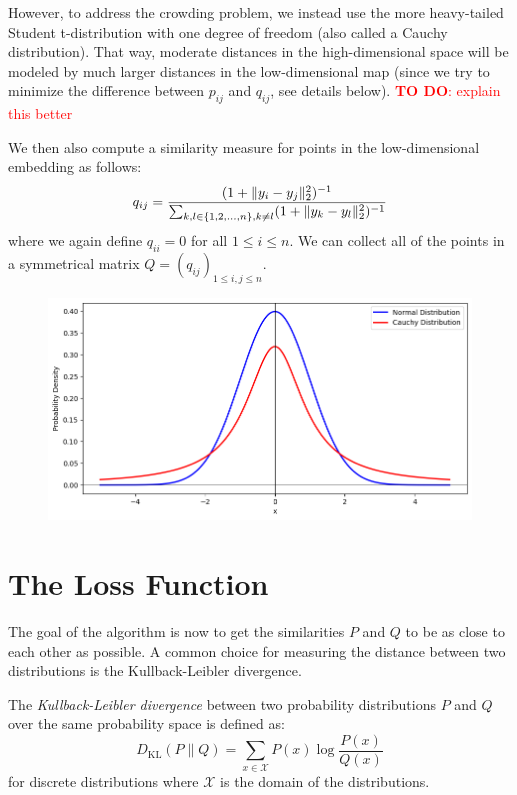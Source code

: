 However, to address the crowding problem, we instead use the more heavy-tailed Student t-distribution with one degree of freedom (also called a Cauchy distribution). That way, moderate distances in the high-dimensional space will be modeled by much larger distances in the low-dimensional map (since we try to minimize the difference between $p_{ij}$ and $q_{ij}$, see details below). 
\textcolor{red}{\textbf{TO DO}: explain this better}


We then also compute a similarity measure for points in the low-dimensional embedding as follows: 
\begin{equation}
    q_{ij} = \frac{(1+ \lVert y_i - y_j\rVert_2^2)^{-1}}{\sum_{k, l \in \{1,2, \dots, n\}, k \neq l} (1+\lVert y_k - y_l\rVert_2^2)^{-1}}
\end{equation}
where we again define $q_{ii} = 0$ for all $1 \leq i \leq n$. We can collect all of the points in a symmetrical matrix $Q = (q_{ij})_{1 \leq i, j \leq n}$. 


\begin{figure}[h]
    \begin{center}
        \includegraphics[width=0.9\linewidth]{figures/Gaussian_Cauchy.png}
    \end{center}
\end{figure}

\section{The Loss Function}
The goal of the algorithm is now to get the similarities $P$ and $Q$ to be as close to each other as possible. 
A common choice for measuring the distance between two distributions is the Kullback-Leibler divergence. 

\begin{defi}
    The \emph{Kullback-Leibler divergence} between two probability distributions $P$ and $Q$ over the same probability space is defined as:
    \[
    D_{\text{KL}}(P \parallel Q) = \sum_{x \in \mathcal{X}} P(x) \log\frac{P(x)}{Q(x)}
    \]
    for discrete distributions where \(\mathcal{X}\) is the domain of the distributions.
\end{defi}


